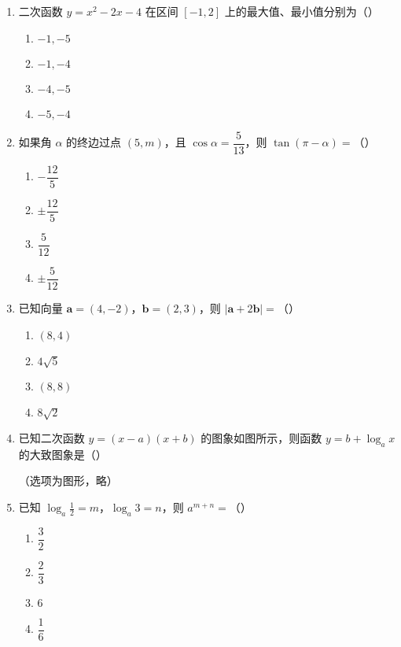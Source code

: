 \documentclass[12pt,a4paper]{ctexart}
\begin{document}
\begin{enumerate}
    \item 二次函数 $y = x^2 - 2x - 4$ 在区间 $[-1,2]$ 上的最大值、最小值分别为（）
    \begin{multicols}{2}
    \begin{enumerate}
        \item $-1, -5$
        \item $-1, -4$
        \item $-4, -5$
        \item $-5, -4$
    \end{enumerate}
    \end{multicols}

    \item 如果角 $\alpha$ 的终边过点 $(5,m)$，且 $\cos\alpha=\dfrac{5}{13}$，则 $\tan(\pi - \alpha)=$（）
    \begin{multicols}{2}
    \begin{enumerate}
        \item $-\dfrac{12}{5}$
        \item $\pm\dfrac{12}{5}$
        \item $\dfrac{5}{12}$
        \item $\pm\dfrac{5}{12}$
    \end{enumerate}
    \end{multicols}

    \item 已知向量 $\boldsymbol{a}=(4,-2)$，$\boldsymbol{b}=(2,3)$，则 $|\boldsymbol{a} + 2\boldsymbol{b}|=$（）
    \begin{multicols}{2}
    \begin{enumerate}
        \item $(8,4)$
        \item $4\sqrt{5}$
        \item $(8,8)$
        \item $8\sqrt{2}$
    \end{enumerate}
    \end{multicols}

    \item 已知二次函数 $y=(x - a)(x + b)$ 的图象如图所示，则函数 $y = b + \log_{a}x$ 的大致图象是（）
    
    （选项为图形，略）

    \item 已知 $\log_{a}\frac{1}{2}=m$，$\log_{a}3 = n$，则 $a^{m + n}=$（）
    \begin{multicols}{2}
    \begin{enumerate}
        \item $\dfrac{3}{2}$
        \item $\dfrac{2}{3}$
        \item $6$
        \item $\dfrac{1}{6}$
    \end{enumerate}
    \end{multicols}


\end{enumerate}
\end{document}
